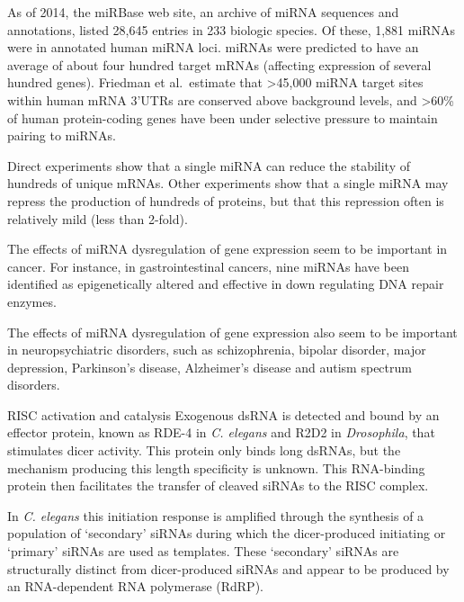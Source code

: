 As of 2014, the miRBase web site, an archive of miRNA sequences and annotations, listed 28,645 entries in 233 biologic species. Of these, 1,881 miRNAs were in annotated human miRNA loci. miRNAs were predicted to have an average of about four hundred target mRNAs (affecting expression of several hundred genes). Friedman et al.~estimate that \textgreater{}45,000 miRNA target sites within human mRNA 3'UTRs are conserved above background levels, and \textgreater{}60\% of human protein-coding genes have been under selective pressure to maintain pairing to miRNAs.

Direct experiments show that a single miRNA can reduce the stability of hundreds of unique mRNAs. Other experiments show that a single miRNA may repress the production of hundreds of proteins, but that this repression often is relatively mild (less than 2-fold).

The effects of miRNA dysregulation of gene expression seem to be important in cancer. For instance, in gastrointestinal cancers, nine miRNAs have been identified as epigenetically altered and effective in down regulating DNA repair enzymes.

The effects of miRNA dysregulation of gene expression also seem to be important in neuropsychiatric disorders, such as schizophrenia, bipolar disorder, major depression, Parkinson's disease, Alzheimer's disease and autism spectrum disorders.

RISC activation and catalysis
Exogenous dsRNA is detected and bound by an effector protein, known as RDE-4 in \emph{C. elegans} and R2D2 in \emph{Drosophila}, that stimulates dicer activity. This protein only binds long dsRNAs, but the mechanism producing this length specificity is unknown. This RNA-binding protein then facilitates the transfer of cleaved siRNAs to the RISC complex.

In \emph{C. elegans} this initiation response is amplified through the synthesis of a population of `secondary' siRNAs during which the dicer-produced initiating or `primary' siRNAs are used as templates. These `secondary' siRNAs are structurally distinct from dicer-produced siRNAs and appear to be produced by an RNA-dependent RNA polymerase (RdRP).

